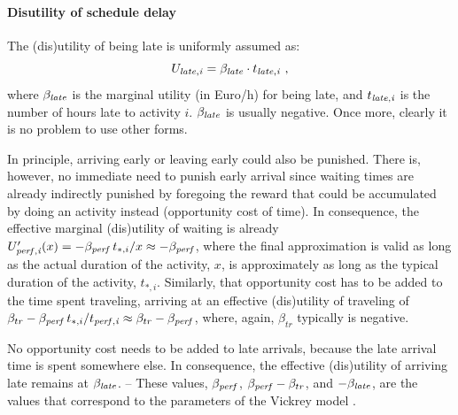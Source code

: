 \paragraph{Disutility of schedule delay}

The (dis)utility of being late is uniformly assumed as:
\begin{equation}
\label{eq:U_late}
U_{\it late,i} = \beta_{\it late} \cdot t_{\it late,i}\ ,
\end{equation}
where
$\beta_{\it late}$ is the marginal utility (in Euro/h) for being late, and
$t_{\it late,i}$ is the number of hours late to activity $i$.
$\beta_{\it late}$ is usually negative.  Once more, clearly it is no
problem to use other forms.

In principle, arriving early or leaving early could also be punished.
There is, however, no immediate need to punish early arrival since
waiting times are already indirectly punished by foregoing the reward
that could be accumulated by doing an activity instead (opportunity
cost of time).  In consequence, the effective marginal (dis)utility of
waiting is already $U'_{\it perf,i}(x) = - \beta_{\it perf} \, t_{*,i}
/ x \approx -\beta_{\it perf}$, where the final approximation is valid
as long as the actual duration of the activity, $x$, is approximately
as long as the typical duration of the activity, $t_{*,i}$.
Similarly, that opportunity cost has to be added to the time spent
traveling, arriving at an effective (dis)utility of traveling of
$\beta_{tr} - \beta_{\it perf} \, t_{*,i} / t_{\it perf,i} \approx
\beta_{tr} - \beta_{\it perf}$, where, again, $\beta_{tr}$ typically
is negative.

No opportunity cost needs to be added to late arrivals, because the
late arrival time is spent somewhere else.  In consequence, the
effective (dis)utility of arriving late remains at $\beta_{\it late}$.
-- These values, $\beta_{\it perf}$, $\beta_{\it perf} - \beta_{tr}$,
and $-\beta_{\it late}$, are the values that correspond to the
parameters of the Vickrey model \citep{ArnottEtcBottleneck-inelastic}.
% 


